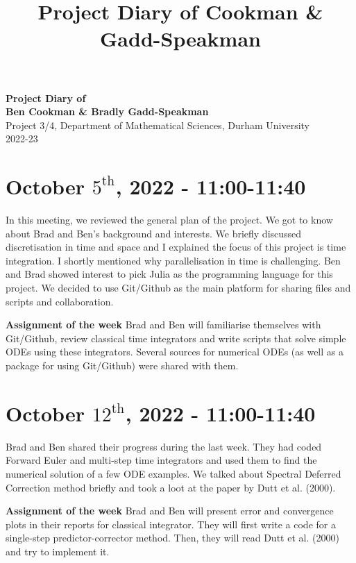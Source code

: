 \documentclass[11pt]{article}
\theoremstyle{definition}
\begin{document}
\setcounter{section}{0}
\title{Project Diary of Cookman \& Gadd-Speakman}

\thispagestyle{empty}

\begin{center}
{\LARGE \bf Project Diary of \\
Ben Cookman \& Bradly Gadd-Speakman}\\
{\Large Project 3/4, Department of Mathematical Sciences, Durham University}\\
{\Large 2022-23}
\end{center}
\section{October $5^{\text{th}}$, 2022 - 11:00-11:40}
In this meeting, we reviewed the general plan of the project. We got to know about Brad and Ben's background and interests. We briefly discussed discretisation in time and space and I explained the focus of this project is time integration. I shortly mentioned why parallelisation in time is challenging. Ben and Brad showed interest to pick Julia as the programming language for this project. We decided to use Git/Github as the main platform for sharing files and scripts and collaboration. 
\begin{shaded}
\textbf{Assignment of the week} \newline
Brad and Ben will familiarise themselves with Git/Github, review classical time integrators and write scripts that solve simple ODEs using these integrators. Several sources for numerical ODEs (as well as a package for using Git/Github) were shared with them.
\end{shaded}

\section{October $12^{\text{th}}$, 2022 - 11:00-11:40}

Brad and Ben shared their progress during the last week. They had coded Forward Euler and multi-step time integrators and used them to find the numerical solution of a few ODE examples. We talked about Spectral Deferred Correction method briefly and took a loot at the paper by Dutt et al. (2000). 
\begin{shaded}
\textbf{Assignment of the week} \newline
Brad and Ben will present error and convergence plots in their reports for classical integrator. They will first write a code for a single-step predictor-corrector method. Then, they will read Dutt et al. (2000) and try to implement it. 
\end{shaded}
\end{document}
